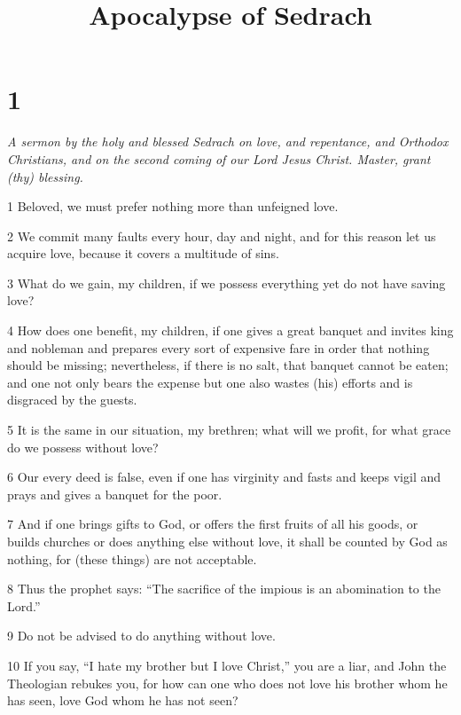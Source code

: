 

\title{Apocalypse of Sedrach}

\chapter{1}

\par \textit{A sermon by the holy and blessed Sedrach on love, and repentance, and Orthodox Christians, and on the second coming of our Lord Jesus Christ. Master, grant (thy) blessing.}

\par 1 Beloved, we must prefer nothing more than unfeigned love. 

\par 2 We commit many faults every hour, day and night, and for this reason let us acquire love, because it covers a multitude of sins. 

\par 3 What do we gain, my children, if we possess everything yet do not have saving love? 

\par 4 How does one benefit, my children, if one gives a great banquet and invites king and nobleman and prepares every sort of expensive fare in order that nothing should be missing; nevertheless, if there is no salt, that banquet cannot be eaten; and one not only bears the expense but one also wastes (his) efforts and is disgraced by the guests. 

\par 5 It is the same in our situation, my brethren; what will we profit, for what grace do we possess without love? 

\par 6 Our every deed is false, even if one has virginity and fasts and keeps vigil and prays and gives a banquet for the poor. 

\par 7 And if one brings gifts to God, or offers the first fruits of all his goods, or builds churches or does anything else without love, it shall be counted by God as nothing, for (these things) are not acceptable. 

\par 8 Thus the prophet says: “The sacrifice of the impious is an abomination to the Lord.” 

\par 9 Do not be advised to do anything without love. 

\par 10 If you say, “I hate my brother but I love Christ,” you are a liar, and John the Theologian rebukes you, for how can one who does not love his brother whom he has seen, love God whom he has not seen? 


